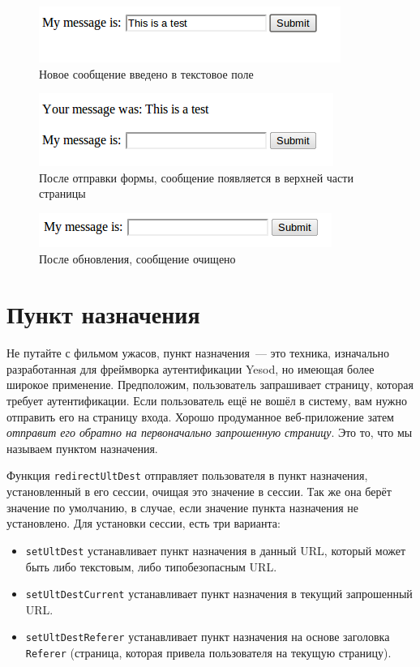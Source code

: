 \begin{figure}[tbh]
  \centering
  \includegraphics{sessions/image-02.png}
  \caption{Новое сообщение введено в текстовое поле}
\end{figure}

\begin{figure}[tbh]
  \centering
  \includegraphics{sessions/image-03.png}
  \caption{После отправки формы, сообщение появляется в верхней части страницы}
\end{figure}

\begin{figure}[tbh]
  \centering
  \includegraphics{sessions/image-04.png}
  \caption{После обновления, сообщение очищено}
\end{figure}

\section{Пункт назначения}

Не путайте с фильмом ужасов, пункт назначения~--- это техника, изначально
разработанная для фреймворка аутентификации Yesod, но имеющая более широкое
применение. Предположим, пользователь запрашивает страницу, которая требует
аутентификации. Если пользователь ещё не вошёл в систему, вам нужно отправить
его на страницу входа. Хорошо продуманное веб-приложение затем \emph{отправит
    его обратно на первоначально запрошенную страницу}. Это то, что мы называем
пунктом назначения.

Функция \lstinline'redirectUltDest' отправляет пользователя в пункт назначения,
установленный в его сессии, очищая это значение в сессии. Так же она берёт
значение по умолчанию, в случае, если значение пункта назначения не
установлено. Для установки сессии, есть три варианта:

\begin{itemize}
  \item \lstinline'setUltDest' устанавливает пункт назначения в данный URL,
      который может быть либо текстовым, либо типобезопасным URL.

  \item \lstinline'setUltDestCurrent' устанавливает пункт назначения в текущий
      запрошенный URL.

  \item \lstinline'setUltDestReferer' устанавливает пункт назначения на основе
      заголовка \lstinline'Referer' (страница, которая привела пользователя на
      текущую страницу).
\end{itemize}

